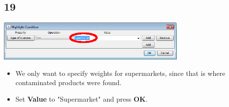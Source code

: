 \documentclass{beamer}
\begin{document}
\subsection{19}
\begin{frame}
	\begin{center}
  		\includegraphics[width=0.7\textwidth]{19.png}
	\end{center}
	\begin{itemize}
		\item We only want to specify weights for supermarkets, since that is where contaminated products were found.
		\item Set \textbf{Value} to "Supermarket" and press \textbf{OK}.
	\end{itemize}
\end{frame}
\end{document}
